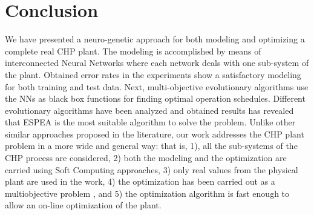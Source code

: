 \section{Conclusion}

We have presented a neuro-genetic approach for both modeling and optimizing a complete real CHP plant. The modeling is accomplished by means of interconnected Neural Networks where each network deals with one sub-system of the plant. Obtained error rates in the experiments show a satisfactory modeling for both training and test data. Next, multi-objective evolutionary algorithms use the NNs as black box functions for finding optimal operation schedules. Different evolutionary algorithms have been analyzed and obtained results has revealed that ESPEA is the most suitable algorithm to solve the problem. Unlike other similar approaches proposed in the literature, our work addresses the CHP plant problem in a more wide and general way: that is, 1), all the sub-systems of the CHP process are considered, 2) both the modeling and the optimization are carried using Soft Computing approaches, 3) only real values from the physical plant are used in the work, 4) the optimization has been carried out as a multiobjective problem , and 5) the optimization algorithm is fast enough to allow an on-line optimization of the plant.
 
